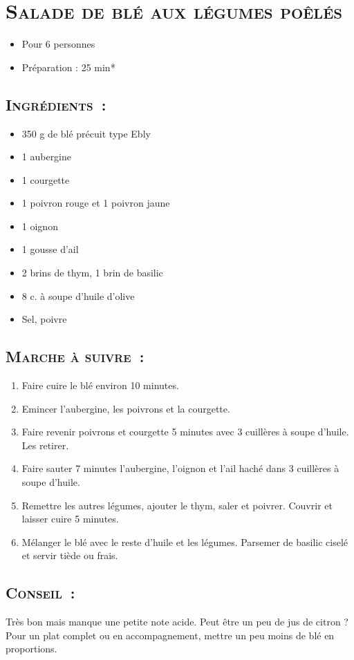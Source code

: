 \section[\normalsize{Salade de bl\'e aux l\'egumes po\^el\'es}]{\LARGE{\textsc{Salade de bl\'e aux l\'egumes po\^el\'es}}}		%


\begin{itemize}
\item Pour 6 personnes
\item Préparation : 25 min*
\end{itemize}

\subsection*{\textsc{Ingr\'edients~:}}

\begin{itemize}
\item 350 g de bl\'e pr\'ecuit type Ebly
\item 1 aubergine
\item 1 courgette
\item 1 poivron rouge et 1 poivron jaune
\item 1 oignon
\item 1 gousse d'ail
\item 2 brins de thym, 1 brin de basilic
\item 8 c. \`a soupe d'huile d'olive
\item Sel, poivre
\end{itemize}


\subsection*{\textsc{Marche \`a suivre~:}}

\begin{enumerate}
\item Faire cuire le bl\'e environ 10 minutes.

\item Emincer l'aubergine, les poivrons et la courgette. 

\item Faire revenir poivrons et courgette 5 minutes avec 3 cuill\`eres \`a soupe d'huile. Les retirer.

\item Faire sauter 7 minutes l'aubergine, l'oignon et l'ail hach\'e dans 3 cuill\`eres \`a soupe d'huile. 

\item Remettre les autres l\'egumes, ajouter le thym, saler et poivrer. Couvrir et laisser cuire 5 minutes.

\item M\'elanger le bl\'e avec le reste d'huile et les l\'egumes. Parsemer de basilic cisel\'e et servir ti\`ede ou frais.
\end{enumerate}
\subsection*{\textsc{Conseil~:}}

Tr\`es bon mais manque une petite note acide. Peut \^etre un peu de jus de citron ?
Pour un plat complet ou en accompagnement, mettre un peu moins de bl\'e en proportions.
